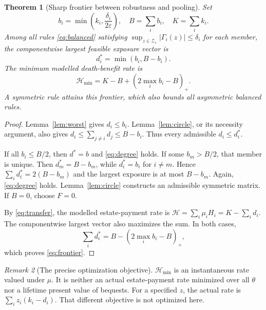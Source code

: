 \documentclass[11pt,a4paper]{article}
\newtheorem{theorem}{Theorem}[section]
\theoremstyle{definition}\newtheorem{definition}[theorem]{Definition}
\theoremstyle{remark}\newtheorem{remark}[theorem]{Remark}
\newcommand{\pos}[1]{\left(#1\right)_+}
\newcommand{\calH}{\mathcal H}
\begin{document}
\begin{theorem}[Sharp frontier between robustness and pooling]\label{thm:frontier}
Set
\[
b_i=\min\left(k_i,\frac{\delta_i}{2\varepsilon}\right),\quad
B=\sum_i b_i,\quad K=\sum_i k_i.
\]
Among all rules \eqref{eq:balanced} satisfying $\sup_{z\in\mathcal Z_\varepsilon}|\Gamma_i(z)|\le\delta_i$ for each member, the componentwise largest feasible exposure vector is
\begin{equation}\label{eq:optimaldegree}
d_i^*=\min(b_i,B-b_i).
\end{equation}
The minimum modelled death-benefit rate is
\begin{equation}\label{eq:frontier}
\boxed{\calH_{\min}=K-B+\pos{2\max_i b_i-B}.}
\end{equation}
A symmetric rule attains this frontier, which also bounds all asymmetric balanced rules.
\end{theorem}
\begin{proof}
Lemma~\ref{lem:worst} gives $d_i\le b_i$. Lemma~\ref{lem:circle}, or its necessity argument, also gives $d_i\le\sum_{j\ne i}d_j\le B-b_i$. Thus every admissible $d_i\le d_i^*$.

If all $b_i\le B/2$, then $d^*=b$ and \eqref{eq:degree} holds. If some $b_m>B/2$, that member is unique. Then $d_m^*=B-b_m$, while $d_i^*=b_i$ for $i\ne m$. Hence $\sum_i d_i^*=2(B-b_m)$ and the largest exposure is at most $B-b_m$. Again, \eqref{eq:degree} holds. Lemma~\ref{lem:circle} constructs an admissible symmetric matrix. If $B=0$, choose $F=0$.

By \eqref{eq:transfer}, the modelled estate-payment rate is $\calH=\sum_i\mu_iH_i=K-\sum_i d_i$. The componentwise largest vector also maximizes the sum. In both cases,
\[
\sum_i d_i^*=B-\pos{2\max_i b_i-B},
\]
which proves \eqref{eq:frontier}.
\end{proof}

\begin{remark}[The precise optimization objective]
$\calH_{\min}$ is an instantaneous rate valued under $\mu$. It is neither an actual estate-payment rate minimized over all $\theta$ nor a lifetime present value of bequests. For a specified $z$, the actual rate is $\sum_i z_i(k_i-d_i)$. That different objective is not optimized here.
\end{remark}
\end{document}

